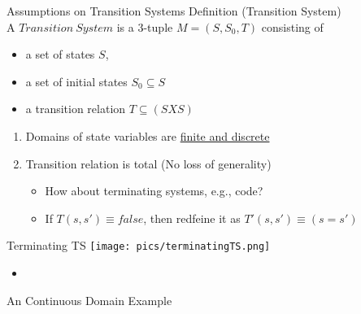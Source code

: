 \documentclass{beamer}
\begin{document}
\begin{frame}{Assumptions on Transition Systems}
Definition (Transition System) \\
A $Transition~System$ is a 3-tuple $M = (S, S_0, T)$ consisting of
\begin{itemize}
\item a set of states $S$,

\item a set of initial states $S_0 \subseteq S$\item a transition relation $T \subseteq (S X S)$
\end{itemize}

\begin{enumerate}
\item<1-> Domains of state variables are \underline{finite and discrete}

\item<2-> Transition relation is total (No loss of generality)
\begin{itemize}
\item How about terminating systems, e.g., code?
\item If $T(s,s') \equiv false$, then redfeine it as $T'(s,s') \equiv (s=s') $
\end{itemize}
\end{enumerate}
\end{frame}

\begin{frame}{Terminating TS}
\texttt{[image: pics/terminatingTS.png]}
\end{frame}

\begin{frame}{}
\end{frame}

\begin{frame}{}
\begin{itemize}
\item

\end{itemize}
\end{frame}

\begin{frame}{}

\end{frame}

\begin{frame}{An Continuous Domain Example}
\end{frame}
\end{document}
